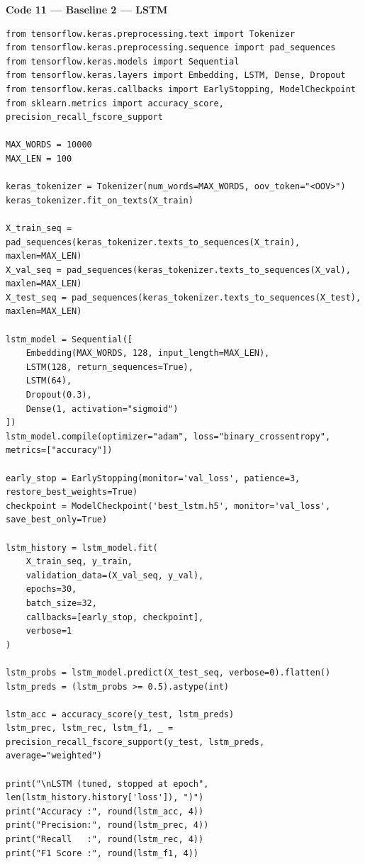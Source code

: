 \documentclass[11pt,a4paper]{article}
\begin{document}
\noindent\textbf{Code 11 --- Baseline 2 — LSTM}
\begin{lstlisting}
from tensorflow.keras.preprocessing.text import Tokenizer
from tensorflow.keras.preprocessing.sequence import pad_sequences
from tensorflow.keras.models import Sequential
from tensorflow.keras.layers import Embedding, LSTM, Dense, Dropout
from tensorflow.keras.callbacks import EarlyStopping, ModelCheckpoint
from sklearn.metrics import accuracy_score, precision_recall_fscore_support

MAX_WORDS = 10000
MAX_LEN = 100

keras_tokenizer = Tokenizer(num_words=MAX_WORDS, oov_token="<OOV>")
keras_tokenizer.fit_on_texts(X_train)

X_train_seq = pad_sequences(keras_tokenizer.texts_to_sequences(X_train), maxlen=MAX_LEN)
X_val_seq = pad_sequences(keras_tokenizer.texts_to_sequences(X_val), maxlen=MAX_LEN)
X_test_seq = pad_sequences(keras_tokenizer.texts_to_sequences(X_test), maxlen=MAX_LEN)

lstm_model = Sequential([
    Embedding(MAX_WORDS, 128, input_length=MAX_LEN),
    LSTM(128, return_sequences=True),
    LSTM(64),
    Dropout(0.3),
    Dense(1, activation="sigmoid")
])
lstm_model.compile(optimizer="adam", loss="binary_crossentropy", metrics=["accuracy"])

early_stop = EarlyStopping(monitor='val_loss', patience=3, restore_best_weights=True)
checkpoint = ModelCheckpoint('best_lstm.h5', monitor='val_loss', save_best_only=True)

lstm_history = lstm_model.fit(
    X_train_seq, y_train,
    validation_data=(X_val_seq, y_val),
    epochs=30,
    batch_size=32,
    callbacks=[early_stop, checkpoint],
    verbose=1
)

lstm_probs = lstm_model.predict(X_test_seq, verbose=0).flatten()
lstm_preds = (lstm_probs >= 0.5).astype(int)

lstm_acc = accuracy_score(y_test, lstm_preds)
lstm_prec, lstm_rec, lstm_f1, _ = precision_recall_fscore_support(y_test, lstm_preds, average="weighted")

print("\nLSTM (tuned, stopped at epoch", len(lstm_history.history['loss']), ")")
print("Accuracy :", round(lstm_acc, 4))
print("Precision:", round(lstm_prec, 4))
print("Recall   :", round(lstm_rec, 4))
print("F1 Score :", round(lstm_f1, 4))
\end{lstlisting}
\end{document}
